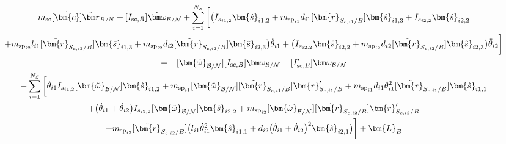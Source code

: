 \begin{multline}
	m_{\text{sc}} [\tilde{\bm{c}}] \ddot{\bm r}_{B/N} + [I_{\text{sc},B}] \dot{\bm\omega}_{\cal B/N} + \sum\limits_{i=1}^{N_S} \bigg[  \big(I_{s_{i1,2}}\bm{\hat{s}}_{i1,2}+m_{\text{sp}_{i1}}d_{i1} [\tilde{\bm{r}}_{S_{c,i1}/B}]   \bm{\hat{s}}_{i1,3} + I_{s_{i2,2}}\bm{\hat{s}}_{i2,2}\\
	+m_{\text{sp}_{i2}}l_{i1} [\tilde{\bm{r}}_{S_{c,i2}/B}]  \bm{\hat{s}}_{i1,3}+m_{\text{sp}_{i2}}d_{i2} [\tilde{\bm{r}}_{S_{c,i2}/B}] \bm{\hat{s}}_{i2,3}\big) \ddot{\theta}_{i1}
	+\big( I_{s_{i2,2}}\bm{\hat{s}}_{i2,2}+m_{\text{sp}_{i2}} d_{i2} [\tilde{\bm{r}}_{S_{c,i2}/B}] \bm{\hat{s}}_{i2,3}\big)\ddot{\theta}_{i2}\bigg] \\
	= -[\bm{\tilde{\omega}}_{\cal B/N}] [I_{\text{sc},B}] \bm\omega_{\cal B/N} - [I'_{\text{sc},B}] \bm\omega_{\cal B/N} \\
	-  \sum\limits_{i=1}^{N_S} \bigg[
	\dot{\theta}_{i1} I_{s_{i1,2}} [\bm{\tilde{\omega}}_{\cal B/N}] \bm{\hat{s}}_{i1,2}
	+m_{\text{sp}_{i1}} [\bm{\tilde{\omega}}_{\cal B/N}] [\tilde{\bm{r}}_{S_{c,i1}/B}] \bm{r}'_{S_{c,i1}/B} +m_{\text{sp}_{i1}}d_{i1}\dot{\theta}_{i1}^2  [\tilde{\bm{r}}_{S_{c,i1}/B}] \bm{\hat{s}}_{i1,1}\\
	+ \big(\dot{\theta}_{i1}+\dot{\theta}_{i2}\big) I_{s_{i2,2}}[\bm{\tilde{\omega}}_{\cal B/N}]\bm{\hat{s}}_{i2,2}
	+m_{\text{sp}_{i2}} [\bm{\tilde{\omega}}_{\cal B/N}] [\tilde{\bm{r}}_{S_{c,i2}/B}] \bm{r}'_{S_{c,i2}/B} 	\\+m_{\text{sp}_{i2}} [\tilde{\bm{r}}_{S_{c,i2}/B}] \big(l_{i1} \dot{\theta}_{i1}^2 \bm{\hat{s}}_{i1,1} + d_{i2}\big(\dot{\theta}_{i1} + \dot{\theta}_{i2}\big)^2\bm{\hat{s}}_{i2,1}\big)\bigg]
	+ \bm{L}_B
	\label{eq:Final7}
\end{multline}

